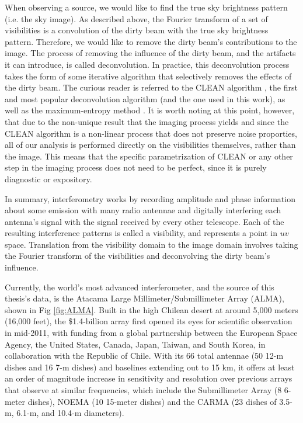When observing a source, we would like to find the true sky brightness pattern (i.e. the sky image). As described above, the Fourier transform of a set of visibilities is a convolution of the dirty beam with the true sky brightness pattern. Therefore, we would like to remove the dirty beam's contributions to the image. The process of removing the influence of the dirty beam, and the artifacts it can introduce, is called deconvolution. In practice, this deconvolution process takes the form of some iterative algorithm that selectively removes the effects of the dirty beam. The curious reader is referred to the CLEAN algorithm \citep{Hogbom1974}, the first and most popular deconvolution algorithm (and the one used in this work), as well as the maximum-entropy method \citep{Wernecke1977,SkillingBryan1984}. It is worth noting at this point, however, that due to the non-unique result that the imaging process yields and since the CLEAN algorithm is a non-linear process that does not preserve noise proporties, all of our analysis is performed directly on the visibilities themselves, rather than the image. This means that the specific parametrization of CLEAN or any other step in the imaging process does not need to be perfect, since it is purely diagnostic or expository.


In summary, interferometry works by recording amplitude and phase information about some emission with many radio antennae and digitally interfering each antenna's signal with the signal received by every other telescope. Each of the resulting interference patterns is called a visibility, and represents a point in $uv$ space. Translation from the visibility domain to the image domain involves taking the Fourier transform of the visibilities and deconvolving the dirty beam's influence.

Currently, the world's most advanced interferometer, and the source of this thesis's data, is the Atacama Large Millimeter/Submillimeter Array (ALMA), shown in Fig \ref{fig:ALMA}. Built in the high Chilean desert at around 5,000 meters (16,000 feet), the \$1.4-billion array first opened its eyes for scientific observation in mid-2011, with funding from a global partnership between the European Space Agency, the United States, Canada, Japan, Taiwan, and South Korea, in collaboration with the Republic of Chile. With its 66 total antennae (50 12-m dishes and 16 7-m dishes) and baselines extending out to 15 km, it offers at least an order of magnitude increase in sensitivity and resolution over previous arrays that observe at similar frequencies, which include the Submillimeter Array (8 6-meter dishes), NOEMA (10 15-meter dishes) and the CARMA (23 dishes of 3.5-m, 6.1-m, and 10.4-m diameters).

